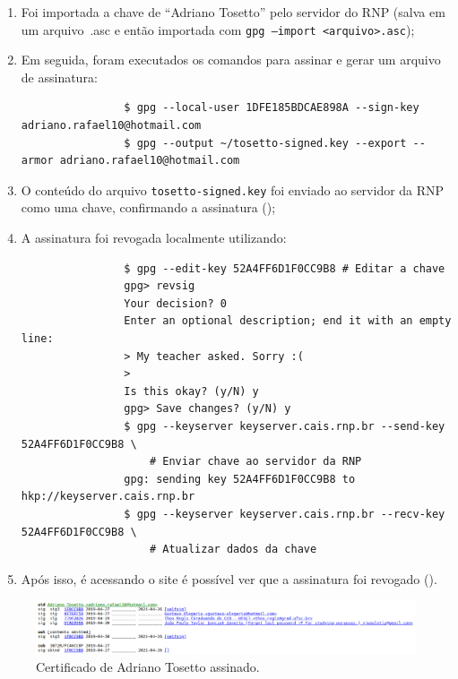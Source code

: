 \documentclass{article}
\begin{document}
    \begin{enumerate}
        \item Foi importada a chave de ``Adriano Tosetto'' pelo servidor do RNP
            (salva em um arquivo~.asc e então importada com \texttt{gpg
            --import <arquivo>.asc});
        \item Em seguida, foram executados os comandos para assinar e gerar um
            arquivo de assinatura:

            \begin{verbatim}
                $ gpg --local-user 1DFE185BDCAE898A --sign-key adriano.rafael10@hotmail.com
                $ gpg --output ~/tosetto-signed.key --export --armor adriano.rafael10@hotmail.com
            \end{verbatim}

        \item O conteúdo do arquivo \texttt{tosetto-signed.key} foi enviado ao
            servidor da RNP como uma chave, confirmando a assinatura
            ();
        \item A assinatura foi revogada localmente utilizando:

            \begin{verbatim}
                $ gpg --edit-key 52A4FF6D1F0CC9B8 # Editar a chave
                gpg> revsig
                Your decision? 0
                Enter an optional description; end it with an empty line:
                > My teacher asked. Sorry :(
                >
                Is this okay? (y/N) y
                gpg> Save changes? (y/N) y
                $ gpg --keyserver keyserver.cais.rnp.br --send-key 52A4FF6D1F0CC9B8 \
                    # Enviar chave ao servidor da RNP
                gpg: sending key 52A4FF6D1F0CC9B8 to hkp://keyserver.cais.rnp.br
                $ gpg --keyserver keyserver.cais.rnp.br --recv-key 52A4FF6D1F0CC9B8 \
                    # Atualizar dados da chave
            \end{verbatim}
        \item Após isso, é acessando o site é possível ver que a assinatura foi
            revogado ().
    \end{enumerate}

    \begin{figure}[h]
        \centering
        \includegraphics[keepaspectratio,width=1\textwidth]{tosetto-signed}
        \caption{%
            Certificado de Adriano Tosetto assinado.\label{fig:revokee-sign}
        }
    \end{figure}
\end{document}
